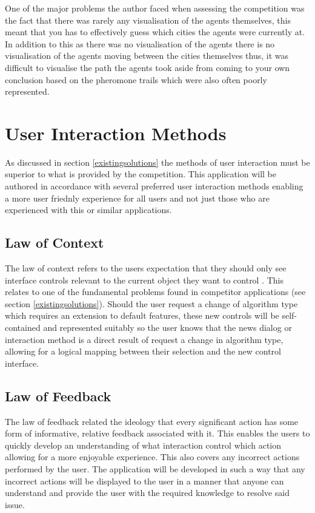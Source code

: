 One of the major problems the author faced when assessing the competition was the fact that there was rarely any visualisation of the agents themselves, this meant that you has to effectively guess which cities the agents were currently at. In addition to this as there was no visualisation of the agents there is no visualisation of the agents moving between the cities themselves thus, it was difficult to visualise the path the agents took aside from coming to your own conclusion based on the pheromone trails which were also often poorly represented.

\section{User Interaction Methods}
\label{uiMethods}
As discussed in section \ref{existingsolutions} the methods of user interaction must be superior to what is provided by the competition. This application will be authored in accordance with several preferred user interaction methods enabling a more user friednly experience for all users and not just those who are experienced with this or similar applications.

\subsection{Law of Context}

The law of context refers to the users expectation that they should only see interface controls relevant to the current object they want to control \cite{99designs:laws}. This relates to one of the fundamental problems found in competitor applications (see section \ref{existingsolutions}). Should the user request a change of algorithm type which requires an extension to default features, these new controls will be self-contained and represented suitably so the user knows that the news dialog or interaction method is a direct result of request a change in algorithm type, allowing for a logical mapping between their selection and the new control interface.

\subsection{Law of Feedback}

The law of feedback related the ideology that every significant action has some form of informative, relative feedback associated with it\cite{99designs:laws}. This enables the users to quickly develop an understanding of what interaction control which action allowing for a more enjoyable experience. This also covers any incorrect actions performed by the user. The application will be developed in such a way that any incorrect actions will be displayed to the user in a manner that anyone can understand and provide the user with the required knowledge to resolve said issue.

